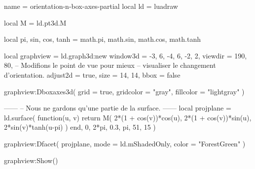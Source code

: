 \documentclass[border = 3pt]{standalone}
\begin{document}
\begin{luadraw*}{name = orientation-n-box-axes-partial}
local ld = luadraw

local M = ld.pt3d.M

local pi, sin, cos, tanh = math.pi, math.sin, math.cos, math.tanh

local graphview = ld.graph3d:new{
  window3d = {-3, 6, -4, 6, -2, 2},
  viewdir  = {190, 80},  -- Modifions le point de vue pour mieux
                         -- visualiser le changement d'orientation.
  adjust2d = true,
  size     = {14, 14},
  bbox     = false
}

graphview:Dboxaxes3d({
  grid      = true,
  gridcolor = "gray",
  fillcolor = "lightgray"
})

------
-- Nous ne gardons qu'une partie de la surface.
------
local projplane = ld.surface(
  function(u, v)
    return M(
      2*(1 + cos(v))*cos(u),
      2*(1 + cos(v))*sin(u),
      2*sin(v)*tanh(u-pi)
    )
  end,
  0, 2*pi, 0.3, pi,
  {51, 15}
)

graphview:Dfacet(
  projplane,
  {
    mode  = ld.mShadedOnly,
    color = "ForestGreen"
  }
)

graphview:Show()
\end{luadraw*}
\end{document}
